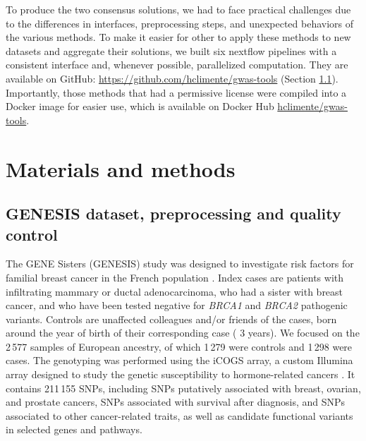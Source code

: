 \documentclass[10pt,letterpaper]{article}
\begin{document}
To produce the two consensus solutions, we had to face practical challenges due to the differences in interfaces, preprocessing steps, and unexpected behaviors of the various methods. To make it easier for other to apply these methods to new datasets and aggregate their solutions, we built six nextflow pipelines \cite{di_tommaso_nextflow_2017} with a consistent interface and, whenever possible, parallelized computation. They are available on GitHub: \url{https://github.com/hclimente/gwas-tools} (Section \ref{methods:data}). Importantly, those methods that had a permissive license were compiled into a Docker image for easier use, which is available on Docker Hub \href{https://hub.docker.com/r/hclimente/gwas-tools}{hclimente/gwas-tools}.

\section{Materials and methods}

\subsection{GENESIS dataset, preprocessing and quality control}
\label{methods:data}

The GENE Sisters (GENESIS) study was designed to investigate risk factors for familial breast cancer in the French population \cite{sinilnikova_genesis:_2016}. Index cases are patients with infiltrating mammary or ductal adenocarcinoma, who had a sister with breast cancer, and who have been tested negative for \emph{BRCA1} and \emph{BRCA2} pathogenic variants. Controls are unaffected colleagues and/or friends of the cases, born around the year of birth of their corresponding case (\textpm{} 3 years). We focused on the 2\,577 samples of European ancestry, of which 1\,279 were controls and 1\,298 were cases. The genotyping was performed using the iCOGS array, a custom Illumina array designed to study the genetic susceptibility to hormone-related cancers \cite{sakoda_turning_2013}. It contains 211\,155 SNPs, including SNPs putatively associated with breast, ovarian, and prostate cancers, SNPs associated with survival after diagnosis, and SNPs associated to other cancer-related traits, as well as candidate functional variants in selected genes and pathways.
\end{document}
